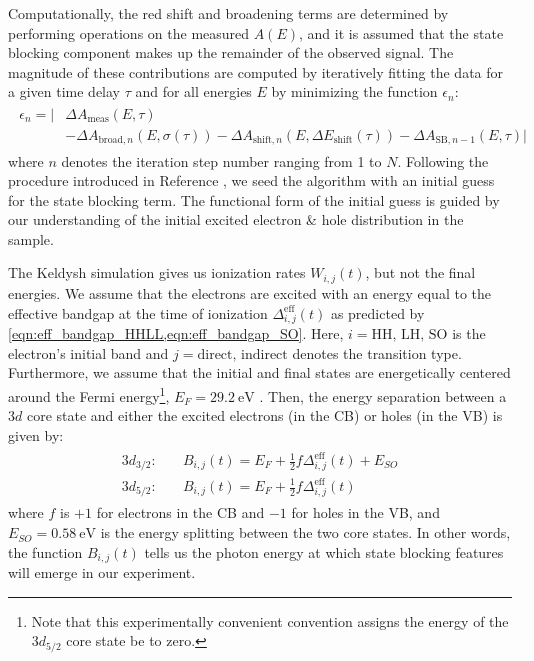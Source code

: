 Computationally, the red shift and broadening terms are determined by performing operations on the measured $A(E)$, and it is assumed that the state blocking component makes up the remainder of the observed signal. The magnitude of these contributions are computed by iteratively fitting the data for a given time delay $\tau$ and for all energies $E$ by minimizing the function $\epsilon_n$:
\begin{align}
\begin{split}
\epsilon_n = \Big| & \Delta A_{\textrm{meas}}(E,\tau) \\
&- \Delta A_{\textrm{broad},n}(E,\sigma(\tau)) - \Delta A_{\textrm{shift},n}(E,\Delta E_{\textrm{shift}}(\tau)) - \Delta A_{\textrm{SB},n-1}(E,\tau) \Big|
\end{split}
\end{align}
where $n$ denotes the iteration step number ranging from 1 to $N$. Following the procedure introduced in Reference \cite{zurchDirectSimultaneousObservation2017}, we seed the algorithm with an initial guess for the state blocking term. The functional form of the initial guess is guided by our understanding of the initial excited electron \& hole distribution in the sample.

The Keldysh simulation gives us ionization rates $W_{i,j}(t)$, but not the final energies. We assume that the electrons are excited with an energy equal to the effective bandgap at the time of ionization $\Delta^{\textrm{eff}}_{i,j}(t)$ as predicted by \cref{eqn:eff_bandgap_HHLL,eqn:eff_bandgap_SO}. Here, $i=\textrm{HH, LH, SO}$ is the electron's initial band and $j=\textrm{direct, indirect}$ denotes the transition type. Furthermore, we assume that the initial and final states are energetically centered around the Fermi energy\footnote{Note that this experimentally convenient convention assigns the energy of the $3d_{5/2}$ core state be to zero.}, $E_F = 29.2 \ \textrm{eV}$ \cite{zurchDirectSimultaneousObservation2017}. Then, the energy separation between a $3d$ core state and either the excited electrons (in the CB) or holes (in the VB) is given by:
\begin{align}
\begin{split}
3d_{3/2}:& \quad B_{i,j}(t) = E_F + \frac{1}{2} f \Delta_{i,j}^{\textrm{eff}}(t) + E_{SO} \\
3d_{5/2}:& \quad B_{i,j}(t) = E_F + \frac{1}{2} f \Delta_{i,j}^{\textrm{eff}}(t)
\end{split}
\end{align}
where $f$ is $+1$ for electrons in the CB and $-1$ for holes in the VB, and $E_{SO} = 0.58 \ \textrm{eV}$ is the energy splitting between the two core states. In other words, the function $B_{i,j}(t)$ tells us the photon energy at which state blocking features will emerge in our experiment.


